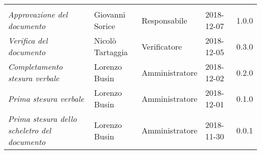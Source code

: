 \newpage 
\section*{}
\begin{table}[H]
	\centering
	\begin{tabular}{p{4cm}|C{3cm}|C{3cm}|R{2.5cm}|R{2cm}}
		
		 & & & & \\
		
		
		\emph{Approvazione del documento} & Giovanni Sorice & Responsabile & 2018-12-07 & 1.0.0 \\
		\hline
		
		\emph{Verifica del documento} & Nicolò Tartaggia & Verificatore & 2018-12-05 & 0.3.0 \\
		\hline

		\emph{Completamento stesura verbale} & Lorenzo Busin & Amministratore & 2018-12-02 & 0.2.0 \\
		\hline

		\emph{Prima stesura verbale} & Lorenzo Busin & Amministratore & 2018-12-01 & 0.1.0 \\
		\hline
		
		\emph{Prima stesura dello scheletro del documento} & Lorenzo Busin & Amministratore & 2018-11-30 & 0.0.1 \\
		
	\end{tabular}
	
\end{table}


\clearpage